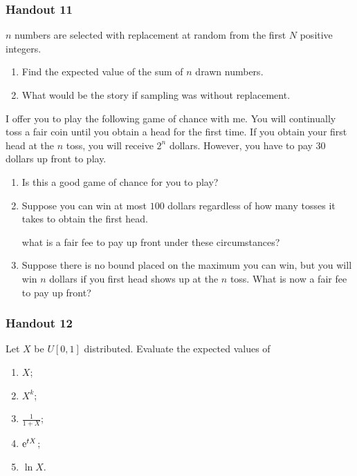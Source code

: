 \subsubsection{Handout 11}
\begin{problem}[Handout 11, 4]
  \(n\) numbers are selected with replacement at random from the first
  \(N\) positive integers.
  \begin{enumerate}[label=(\alph*),noitemsep]
  \item Find the expected value of the sum of \(n\) drawn numbers.
  \item What would be the story if sampling was without replacement.
  \end{enumerate}
\end{problem}
\begin{solution*}
\end{solution*}

\begin{problem}[Handout 11, \# 5]
  I offer you to play the following game of chance with me. You will
  continually toss a fair coin until you obtain a head for the first
  time. If you obtain your first head at the \(n\) toss, you
  will receive \(2^n\) dollars. However, you have to pay \(30\) dollars up
  front to play.
  \begin{enumerate}[label=(\alph*),noitemsep]
  \item Is this a good game of chance for you to play?
  \item Suppose you can win at most \(100\) dollars regardless of how many
    tosses it takes to obtain the first head.

    \noindent what is a fair fee to pay up front under these circumstances?
  \item Suppose there is no bound placed on the maximum you can win, but
    you will win \(n\) dollars if you first head shows up at the
    \(n\) toss. What is now a fair fee to pay up front?
  \end{enumerate}
\end{problem}
\begin{solution*}
\end{solution*}

\subsubsection{Handout 12}
\begin{problem}[Handout 12, \# 6]
  Let \(X\) be \(U[0,1]\) distributed. Evaluate the expected values of
  \begin{enumerate}[label=(\alph*),noitemsep]
  \item  \(X\);
  \item \(X^k\);
  \item \(\frac{1}{1+X}\);
  \item \(\mathrm{e}^{tX}\);
  \item \(\ln X\).
  \end{enumerate}
\end{problem}
\begin{solution*}
\end{solution*}

